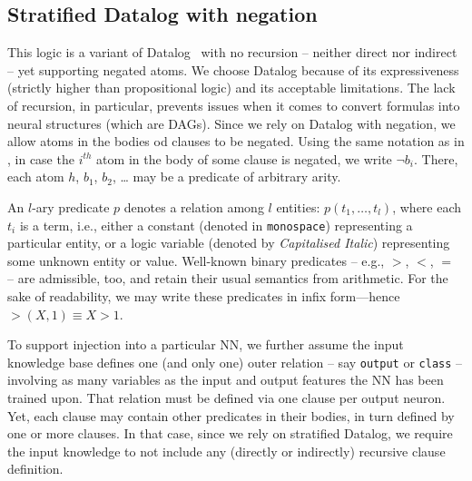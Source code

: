 \subsection{Stratified Datalog with negation}\label{subsec:skistratified-datalog-with-negation}
%
This logic is a variant of Datalog~\cite{DBLP:books/mc/18/MaierTKW18} with no recursion -- neither direct nor indirect -- yet supporting negated atoms.
%
We choose Datalog because of its expressiveness (strictly higher than propositional logic) and its acceptable limitations.
%
The lack of recursion, in particular, prevents issues when it comes to convert formulas into neural structures (which are \glspl{DAG}).
%
Since we rely on Datalog with negation, we allow atoms in the bodies od clauses to be negated.
%
Using the same notation as in , in case the $i^{th}$ atom in the body of some clause is negated, we write $\neg b_{i}$.
%
There, each atom $h$, $b_{1}$, $b_{2}$, \dots{} may be a predicate of arbitrary arity.

An \(l\)-ary predicate \(p\) denotes a relation among \(l\) entities: \(p(t_1, \dots, t_l)\), where each \(t_i\) is a term, i.e., either a constant (denoted in \texttt{monospace}) representing a particular entity, or a logic variable (denoted by \textit{Capitalised Italic}) representing some unknown entity or value.
%
Well-known binary predicates – e.g., \(>\), \(<\), \(=\) – are admissible, too, and retain their usual semantics from arithmetic.
%
For the sake of readability, we may write these predicates in infix form—hence \(>(X, 1) \equiv X > 1\).

To support injection into a particular \gls{NN}, we further assume the input knowledge base defines one (and only one) outer relation -- say \texttt{output} or \texttt{class} -- involving as many variables as the input and output features the \gls{NN} has been trained upon.
%
That relation must be defined via one clause per output neuron.
%
Yet, each clause may contain other predicates in their bodies, in turn defined by one or more clauses.
%
In that case, since we rely on stratified Datalog, we require the input knowledge to not include any (directly or indirectly) recursive clause definition.

